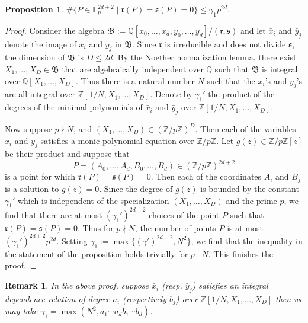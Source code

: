 \documentclass[12pt]{amsart}
\newtheorem{remark}[theorem]{Remark}
\newtheorem{proposition}[theorem]{Proposition}
\newcommand{\Z}{\mathbb{Z}}
\newcommand{\Q}{\mathbb{Q}}
\newcommand{\F}{\mathbb{F}}
\newcommand{\op}[1]{\operatorname{#1}}
\numberwithin{equation}{section}
\begin{document}
\begin{proposition}\label{Cp to the 2d}
    $\# \{P\in \F_p^{2d+2}\mid \mathfrak{r}(P)=\mathfrak{s}(P)=0\}\leq \gamma_1 p^{2d}$. 
\end{proposition}
\begin{proof}
Consider the algebra $\mathfrak{B}:=\Q[x_0, \dots, x_d, y_0, \dots, y_d]/(\mathfrak{r},\mathfrak{s})$ and let $\bar{x}_i$ and $\bar{y}_j$ denote the image of
$x_i$ and $y_j$ in $\mathfrak{B}$. Since $\mathfrak{r}$ is irreducible and does not divide
$\mathfrak{s}$, the dimension of $\mathfrak{B}$ is $D\leq 2d$. By the Noether normalization lemma, 
there exist $X_1,\ldots,X_D\in \mathfrak{B}$ that are algebraically independent over $\Q$ such that 
$\mathfrak{B}$ is integral over $\Q[X_1, \dots, X_{D}]$. Thus there is a natural number $N$ such that the $\bar{x}_i$'s and $\bar{y}_j$'s are all  integral over $\Z[1/N, X_1, \dots, X_{D}]$. Denote by $\gamma_1'$ the product of the degrees of the minimal polynomials of $\bar{x}_i$ and $\bar{y}_j$ over $\Z[1/N, X_1, \dots, X_{D}]$.

\par Now suppose $p\nmid N$, and $(X_1, \dots, X_{D})\in (\Z/p\Z)^D$. Then each of the variables $x_i$ and $y_j$ satisfies a monic polynomial equation over $\Z/p\Z$. Let $g(z)\in \Z/p\Z[z]$ be their product and suppose that \[P=(A_0, \dots, A_d, B_0, \dots, B_d)\in (\Z/p\Z)^{2d+2}\] is a point for which $\mathfrak{r}(P)=\mathfrak{s}(P)=0$. Then each of the coordinates $A_i$ and $B_j$ is a solution to $g(z)=0$. Since the degree of $g(z)$ is bounded by the constant $\gamma_1'$ which is independent of the specialization $(X_1, \dots, X_D)$ and the prime $p$, we find that there are at most $(\gamma_1')^{2d+2}$ choices of the point $P$ such that $\mathfrak{r}(P)=\mathfrak{s}(P)=0$. Thus for $p\nmid N$, the number of points $P$ is at most $(\gamma_1')^{2d+2} p^{2d}$. Setting $\gamma_1:=\op{max}\{(\gamma')^{2d+2},N^2\}$, we find that the inequality in the statement of the proposition holds trivially for $p\mid N$. This finishes the proof. 
\end{proof}
\begin{remark}
    In the above proof, suppose $\bar{x}_i$ (resp. $\bar{y}_j$) satisfies an integral dependence relation of degree $a_i$ (respectively $b_j$) over 
    $\Z[1/N,X_1,\ldots,X_D]$
    then we may take $\gamma_1=\max(N^2,a_1\cdots a_db_1\cdots b_d)$.
\end{remark}
\end{document}
